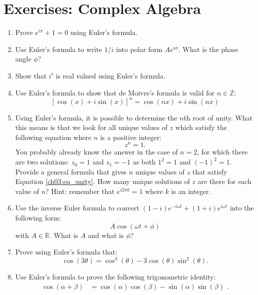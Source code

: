 \newpage
\section{Exercises: Complex Algebra}

\begin{enumerate}
\item Prove $e^{i\pi}+1=0$ using Euler's formula. 
\item Use Euler's formula to write $1/i$ into polar form $Ae^{i\phi}$. What is the phase angle $\phi$?
\item Show that $i^{i}$ is real valued using Euler's formula. 
\item Use Euler's formula to show that de Moivre's formula is valid for $n\in\mathbb{Z}$:
$$[\cos(x)+i\sin(x)]^{n}=\cos(nx)+i\sin(nx)$$

\item Using Euler's formula, it is possible to determine the $n$th root of unity. What this means is that we look for all unique values of $z$ which satisfy the following equation where $n$ is a positive integer:
\begin{equation}
    z^{n}=1.
    \label{ch03:eq_unity}
\end{equation}
You probably already know the answer in the case of $n=2$, for which there are two solutions: $z_{0}=1$ and $z_{1}=-1$ as both $1^{2}=1$ and $(-1)^{2}=1$. \\
Provide a general formula that gives $n$ unique values of $z$ that
satisfy Equation \ref{ch03:eq_unity}. How many unique solutions of $z$ are there
for each value of $n$? Hint: remember that $e^{i 2\pi k} = 1$ where
$k$ is an integer. 
\item Use the inverse Euler formula to convert $(1-i) e^{-i \omega t} + (1+i) e^{i
  \omega t}$ into the following form:
\begin{equation*}
    A \cos(\omega t  + \phi)
\end{equation*}
with $A\in \mathbb{R}$. What is $A$ and what is $\phi$?

\item Prove using Euler's formula that:
\begin{equation*}
    \cos(3\theta )= \cos^3(\theta)-3\cos(\theta)\sin^2(\theta).
\end{equation*}

\item Use Euler's formula to prove the following trigonometric identity:
\begin{align*}
\cos(\alpha + \beta)&=\cos(\alpha)\cos(\beta) - \sin(\alpha)\sin(\beta)\,\,.
\end{align*}


\end{enumerate}
